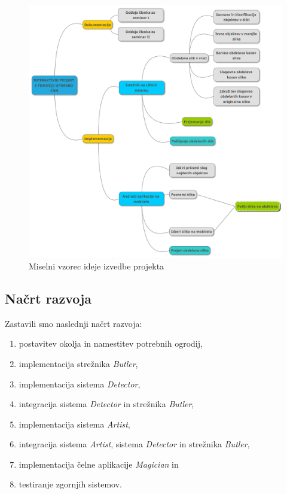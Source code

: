 \documentclass[runningheads,a4paper]{llncs}
\begin{document}
\begin{figure}[H]
\centering
\includegraphics[width=150mm, center]{figures/mind_map.png}
\caption{Miselni vzorec ideje izvedbe projekta}
\label{fig:mind_map}
\end{figure}

\pagebreak

\subsection{Načrt razvoja}

Zastavili smo naslednji načrt razvoja:
\begin{enumerate}
\item postavitev okolja in namestitev potrebnih ogrodij,
\item implementacija strežnika \textit{Butler},
\item implementacija sistema \textit{Detector},
\item integracija sistema \textit{Detector} in strežnika \textit{Butler},
\item implementacija sistema \textit{Artist},
\item integracija sistema \textit{Artist}, sistema \textit{Detector} in strežnika \textit{Butler},
\item implementacija čelne aplikacije \textit{Magician} in
\item testiranje zgornjih sistemov.
\end{enumerate}
\end{document}
